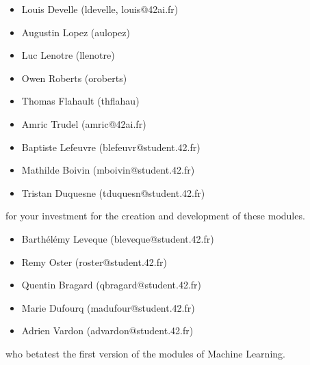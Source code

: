\documentclass{42-en}
\begin{document}
\begin{itemize}
    \item Louis Develle (ldevelle, louis@42ai.fr)
    \item Augustin Lopez (aulopez)
    \item Luc Lenotre (llenotre)
    \item Owen Roberts (oroberts)
    \item Thomas Flahault (thflahau)
    \item Amric Trudel (amric@42ai.fr)
    \item Baptiste Lefeuvre (blefeuvr@student.42.fr)
    \item Mathilde Boivin (mboivin@student.42.fr)
    \item Tristan Duquesne (tduquesn@student.42.fr)
\end{itemize}
for your investment for the creation and development of these modules.

\begin{itemize}
    \item Barthélémy Leveque (bleveque@student.42.fr)
    \item Remy Oster (roster@student.42.fr)
    \item Quentin Bragard (qbragard@student.42.fr)
    \item Marie Dufourq (madufour@student.42.fr)
    \item Adrien Vardon (advardon@student.42.fr)
\end{itemize}
who betatest the first version of the modules of Machine Learning.
\vfill
\doclicenseThis
\end{document}
